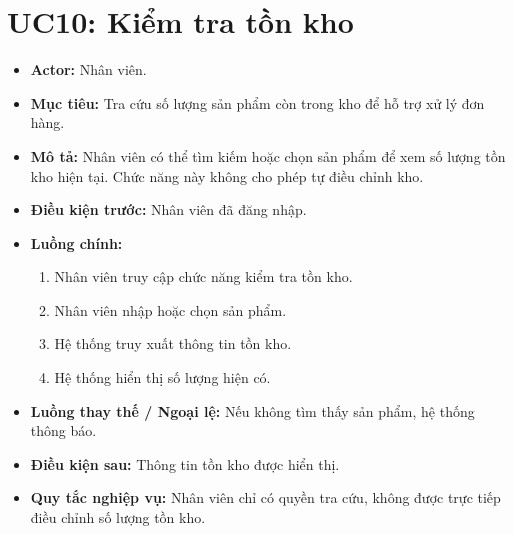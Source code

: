 \section{UC10: Kiểm tra tồn kho}
\begin{itemize}
    \item \textbf{Actor:} Nhân viên.
    \item \textbf{Mục tiêu:} Tra cứu số lượng sản phẩm còn trong kho để hỗ trợ xử lý đơn hàng.
    \item \textbf{Mô tả:} Nhân viên có thể tìm kiếm hoặc chọn sản phẩm để xem số lượng tồn kho hiện tại. Chức năng này không cho phép tự điều chỉnh kho.
    \item \textbf{Điều kiện trước:} Nhân viên đã đăng nhập.
    \item \textbf{Luồng chính:}
    \begin{enumerate}
        \item Nhân viên truy cập chức năng kiểm tra tồn kho.
        \item Nhân viên nhập hoặc chọn sản phẩm.
        \item Hệ thống truy xuất thông tin tồn kho.
        \item Hệ thống hiển thị số lượng hiện có.
    \end{enumerate}
    \item \textbf{Luồng thay thế / Ngoại lệ:} Nếu không tìm thấy sản phẩm, hệ thống thông báo.
    \item \textbf{Điều kiện sau:} Thông tin tồn kho được hiển thị.
    \item \textbf{Quy tắc nghiệp vụ:} Nhân viên chỉ có quyền tra cứu, không được trực tiếp điều chỉnh số lượng tồn kho.
\end{itemize}

